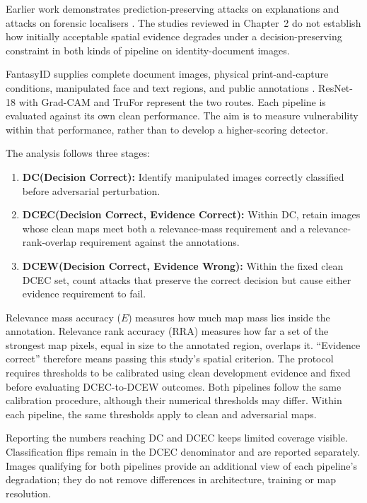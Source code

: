 Earlier work demonstrates prediction-preserving attacks on explanations and attacks on forensic localisers \parencite{ghorbani2019fragile,dombrowski2019explanations,cao2024transferable}. The studies reviewed in Chapter~2 do not establish how initially acceptable spatial evidence degrades under a decision-preserving constraint in both kinds of pipeline on identity-document images.

FantasyID supplies complete document images, physical print-and-capture conditions, manipulated face and text regions, and public annotations \parencite{korshunov2025fantasyid}. ResNet-18 with Grad-CAM and TruFor represent the two routes. Each pipeline is evaluated against its own clean performance. The aim is to measure vulnerability within that performance, rather than to develop a higher-scoring detector.

The analysis follows three stages:
\begin{enumerate}
    \item \textbf{DC(Decision Correct):} Identify manipulated images correctly classified before adversarial perturbation.
    \item \textbf{DCEC(Decision Correct, Evidence Correct):} Within DC, retain images whose clean maps meet both a relevance-mass requirement and a relevance-rank-overlap requirement against the annotations.
    \item \textbf{DCEW(Decision Correct, Evidence Wrong):} Within the fixed clean DCEC set, count attacks that preserve the correct decision but cause either evidence requirement to fail.
\end{enumerate}

Relevance mass accuracy ($E$) measures how much map mass lies inside the annotation. Relevance rank accuracy (RRA) measures how far a set of the strongest map pixels, equal in size to the annotated region, overlaps it. ``Evidence correct'' therefore means passing this study's spatial criterion. The protocol requires thresholds to be calibrated using clean development evidence and fixed before evaluating DCEC-to-DCEW outcomes. Both pipelines follow the same calibration procedure, although their numerical thresholds may differ. Within each pipeline, the same thresholds apply to clean and adversarial maps.

Reporting the numbers reaching DC and DCEC keeps limited coverage visible. Classification flips remain in the DCEC denominator and are reported separately. Images qualifying for both pipelines provide an additional view of each pipeline's degradation; they do not remove differences in architecture, training or map resolution.

